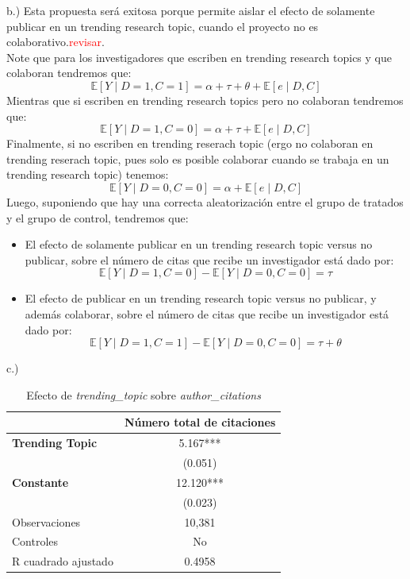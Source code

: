 \documentclass[a4paper, answers, addpoints, 11pt]{exam}
\begin{document}
\begin{itemize}
\begin{mdframed}
       


        b.) Esta propuesta será exitosa porque permite aislar el efecto de solamente publicar en un trending research topic, cuando el proyecto no es colaborativo.\textcolor{red}{revisar}. \\
          
        
        Note que para los investigadores que escriben en trending research topics y que colaboran tendremos que:
       \[
\mathbb{E}[Y \mid D=1, C=1] = \alpha + \tau + \theta +\mathbb{E}[e \mid D, C]
\]
Mientras que si escriben en trending research topics pero no colaboran tendremos que:
       \[
\mathbb{E}[Y \mid D=1, C=0] = \alpha + \tau +\mathbb{E}[e \mid D, C]  
\]
Finalmente, si no escriben en trending reserach topic (ergo no colaboran en trending reserach topic, pues solo es posible colaborar cuando se trabaja en un trending research topic) tenemos:
  \[
\mathbb{E}[Y \mid D=0, C=0] = \alpha +\mathbb{E}[e \mid D, C]  
\]
Luego, suponiendo que hay una correcta aleatorización entre el grupo de tratados y el grupo de control, tendremos que:
\begin{itemize}
    \item El efecto de solamente publicar en un trending research topic versus no publicar, sobre el número de citas que recibe un investigador está dado por:
    \[
\mathbb{E}[Y \mid D=1, C=0]- \mathbb{E}[Y \mid D=0, C=0] =  \tau   
\]

    \item El efecto de publicar en un trending research topic versus no publicar, y además colaborar, sobre el número de citas que recibe un investigador está dado por:
    \[
\mathbb{E}[Y \mid D=1, C=1]- \mathbb{E}[Y \mid D=0, C=0] = \tau +\theta
\]


\end{itemize}

c.)\begin{table}[H]
    \centering
    \caption{Efecto de \textit{trending\_topic} sobre \textit{author\_citations}}
    \label{tab:resultados}
    \begin{tabular}{l c}
        \toprule
        & Número total de citaciones\\
        \midrule
        \textbf{Trending Topic} & 5.167*** \\
        & (0.051) \\
        \textbf{Constante} & 12.120*** \\
        & (0.023) \\
        \midrule
        Observaciones & 10,381 \\
        Controles & No \\
        R cuadrado ajustado & 0.4958 \\
        \bottomrule
    \end{tabular}
    

\end{table}
\end{mdframed}
\end{itemize}
\end{document}
